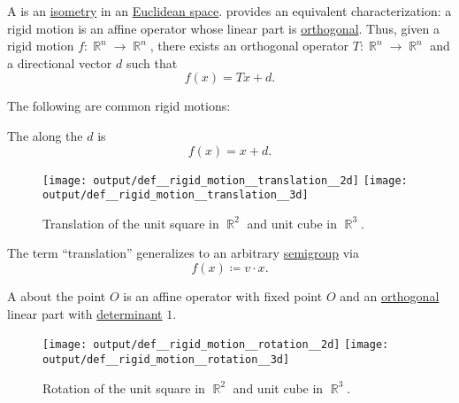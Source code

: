 \begin{definition}\label{def:rigid_motion}\mimprovised
  A  is an \hyperref[def:isometry]{isometry} in an \hyperref[def:euclidean_space]{Euclidean space}.  provides an equivalent characterization: a rigid motion is an affine operator whose linear part is \hyperref[def:unitary_operator]{orthogonal}. Thus, given a rigid motion \( f: \BbbR^n \to \BbbR^n \), there exists an orthogonal operator \( T: \BbbR^n \to \BbbR^n \) and a directional vector \( d \) such that
  \begin{equation*}
    f(x) = Tx + d.
  \end{equation*}

  The following are common rigid motions:
  \begin{thmenum}
     The  along the  \( d \) is
    \begin{equation*}
      f(x) = x + d.
    \end{equation*}

    \begin{figure}[!ht]
      \hfill
      \texttt{[image: output/def\_\_rigid\_motion\_\_translation\_\_2d]}
      \hfill
      \texttt{[image: output/def\_\_rigid\_motion\_\_translation\_\_3d]}
      \hfill
      \hfill
      \caption{Translation of the unit square in \( \BbbR^2 \) and unit cube in \( \BbbR^3 \).}\label{fig:def:rigid_motion/translation}
    \end{figure}

    The term \enquote{translation} generalizes to an arbitrary \hyperref[def:semigroup]{semigroup} via
    \begin{equation*}
      f(x) \coloneqq v \cdot x.
    \end{equation*}

     A  about the point \( O \) is an affine operator with fixed point \( O \) and an \hyperref[def:unitary_operator]{orthogonal} linear part with \hyperref[def:matrix_determinant]{determinant} \( 1 \).

    \begin{figure}[!ht]
      \hfill
      \texttt{[image: output/def\_\_rigid\_motion\_\_rotation\_\_2d]}
      \hfill
      \texttt{[image: output/def\_\_rigid\_motion\_\_rotation\_\_3d]}
      \hfill
      \hfill
      \caption{Rotation of the unit square in \( \BbbR^2 \) and unit cube in \( \BbbR^3 \).}\label{fig:def:rigid_motion/rotation}
    \end{figure}


\end{thmenum}
\end{definition}
